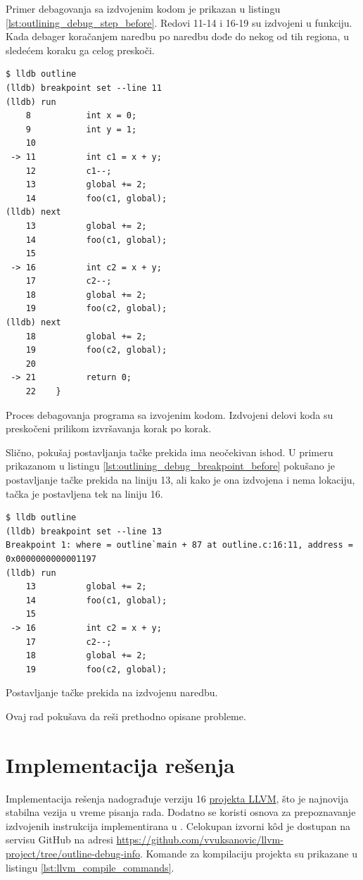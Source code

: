 \documentclass[12pt,oneside]{memoir}
\begin{document}
Primer debagovanja sa izdvojenim kodom je prikazan u listingu \ref{lst:outlining_debug_step_before}.
Redovi 11-14 i 16-19 su izdvojeni u funkciju.
Kada debager koračanjem naredbu po naredbu dođe do nekog od tih regiona, u sledećem koraku ga celog preskoči.
\begin{listing}[!ht]
\begin{verbatim}
$ lldb outline
(lldb) breakpoint set --line 11
(lldb) run
    8           int x = 0;
    9           int y = 1;
    10          
 -> 11          int c1 = x + y;
    12          c1--;
    13          global += 2;
    14          foo(c1, global);
(lldb) next
    13          global += 2;
    14          foo(c1, global);
    15          
 -> 16          int c2 = x + y;
    17          c2--;
    18          global += 2;
    19          foo(c2, global);
(lldb) next
    18          global += 2;
    19          foo(c2, global);
    20          
 -> 21          return 0;
    22    }
\end{verbatim}
\caption{Proces debagovanja programa sa izvojenim kodom. Izdvojeni delovi koda su preskočeni prilikom izvršavanja korak po korak.}
\label{lst:outlining_debug_step_before}
\end{listing}
Slično, pokušaj postavljanja tačke prekida ima neočekivan ishod.
U primeru prikazanom u listingu \ref{lst:outlining_debug_breakpoint_before} pokušano je postavljanje tačke prekida na liniju 13, ali kako je ona izdvojena i nema lokaciju, tačka je postavljena tek na liniju 16.
\begin{listing}[!ht]
\begin{verbatim}
$ lldb outline
(lldb) breakpoint set --line 13
Breakpoint 1: where = outline`main + 87 at outline.c:16:11, address = 0x0000000000001197
(lldb) run
    13          global += 2;
    14          foo(c1, global);
    15
 -> 16          int c2 = x + y;
    17          c2--;
    18          global += 2;
    19          foo(c2, global);
\end{verbatim}
\caption{Postavljanje tačke prekida na izdvojenu naredbu.}
\label{lst:outlining_debug_breakpoint_before}
\end{listing}
Ovaj rad pokušava da reši prethodno opisane probleme.

\chapter{Implementacija rešenja}
\label{sec:implementation}

Implementacija rešenja nadograđuje verziju 16 \href{https://llvm.org/}{projekta LLVM}, što je najnovija stabilna vezija u vreme pisanja rada.
Dodatno se koristi osnova za prepoznavanje izdvojenih instrukcija implementirana u \cite{tomasevic2022autlajning}.
Celokupan izvorni k\^od je dostupan na servisu GitHub na adresi \url{https://github.com/vvuksanovic/llvm-project/tree/outline-debug-info}.
Komande za kompilaciju projekta su prikazane u listingu \ref{lst:llvm_compile_commands}.
\end{document}

